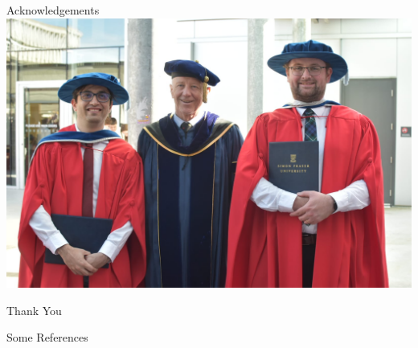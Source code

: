 \documentclass[14pt]{beamer}
\begin{document}
\begin{frame}{Acknowledgements}
    \includegraphics[width=\textwidth]{Figures/Convocation Image.jpg}
\end{frame}

\begin{frame}
    \centering
    \Huge Thank You
\end{frame}

\begin{frame}{Some References}
    
    
\end{frame}
\end{document}
